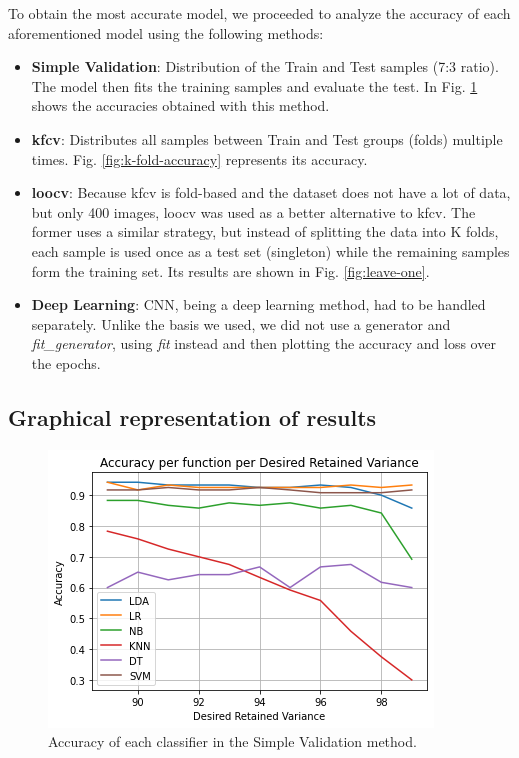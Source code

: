 \documentclass[conference]{IEEEtran}
\begin{document}
To obtain the most accurate model, we proceeded to analyze the accuracy of each aforementioned model using the following methods:

\begin{itemize}
    \item \textbf{Simple Validation}: Distribution of the Train and Test samples (7:3 ratio). The model then fits the training samples and evaluate the test. In Fig. \ref{fig:simple-validation} shows the accuracies obtained with this method.
    \item \textbf{\gls{kfcv}}: Distributes all samples between Train and Test groups (folds) multiple times. Fig. \ref{fig:k-fold-accuracy} represents its accuracy.
    \item \textbf{\gls{loocv}}: Because \gls{kfcv} is fold-based and the dataset does not have a lot of data, but only 400 images, \gls{loocv} was used as a better alternative to \gls{kfcv}. The former uses a similar strategy, but instead of splitting the data into K folds, each sample is used once as a test set (singleton) while the remaining samples form the training set. Its results are shown in Fig. \ref{fig:leave-one}.
    \item \textbf{Deep Learning}: CNN, being a deep learning method, had to be handled separately. Unlike the basis we used\cite{olivetti_knn_cnn}, we did not use a generator and \textit{fit\_generator}, using \textit{fit} instead and then plotting the accuracy and loss over the epochs.
\end{itemize}

\subsection{Graphical representation of results}

\begin{figure}
    \centering
    \includegraphics[scale=0.65]{images/15_Accuracy_per_function_per_Desired_Retained_Variance.png}
    \caption{Accuracy of each classifier in the Simple Validation method.}
    \label{fig:simple-validation}
\end{figure}
\end{document}
